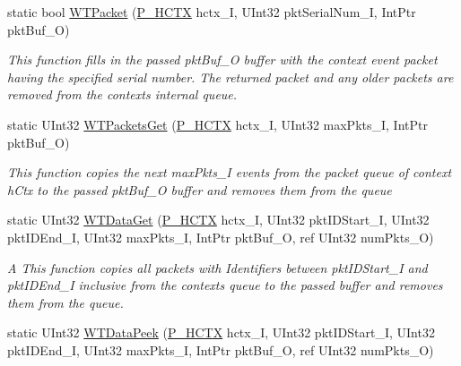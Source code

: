 \begin{DoxyCompactItemize}
static bool \mbox{\hyperlink{class_wintab_d_n_1_1_c_wintab_funcs_ae6705650a7f185b2fa67912761c1e5b3}{W\+T\+Packet}} (\mbox{\hyperlink{namespace_wintab_d_n_a9ae61204cd14d7ef23008991d1fb6dff}{P\+\_\+\+H\+C\+TX}} hctx\+\_\+I, U\+Int32 pkt\+Serial\+Num\+\_\+I, Int\+Ptr pkt\+Buf\+\_\+O)
\begin{DoxyCompactList}\small\item\em This function fills in the passed pkt\+Buf\+\_\+O buffer with the context event packet having the specified serial number. The returned packet and any older packets are removed from the context\textquotesingle{}s internal queue. \end{DoxyCompactList}\item 
static U\+Int32 \mbox{\hyperlink{class_wintab_d_n_1_1_c_wintab_funcs_a3a2d7576ad89c1b63dbe8280e4b054b6}{W\+T\+Packets\+Get}} (\mbox{\hyperlink{namespace_wintab_d_n_a9ae61204cd14d7ef23008991d1fb6dff}{P\+\_\+\+H\+C\+TX}} hctx\+\_\+I, U\+Int32 max\+Pkts\+\_\+I, Int\+Ptr pkt\+Buf\+\_\+O)
\begin{DoxyCompactList}\small\item\em This function copies the next max\+Pkts\+\_\+I events from the packet queue of context h\+Ctx to the passed pkt\+Buf\+\_\+O buffer and removes them from the queue \end{DoxyCompactList}\item 
static U\+Int32 \mbox{\hyperlink{class_wintab_d_n_1_1_c_wintab_funcs_a95fc57793075f5982e0e8112d196c778}{W\+T\+Data\+Get}} (\mbox{\hyperlink{namespace_wintab_d_n_a9ae61204cd14d7ef23008991d1fb6dff}{P\+\_\+\+H\+C\+TX}} hctx\+\_\+I, U\+Int32 pkt\+I\+D\+Start\+\_\+I, U\+Int32 pkt\+I\+D\+End\+\_\+I, U\+Int32 max\+Pkts\+\_\+I, Int\+Ptr pkt\+Buf\+\_\+O, ref U\+Int32 num\+Pkts\+\_\+O)
\begin{DoxyCompactList}\small\item\em A This function copies all packets with Identifiers between pkt\+I\+D\+Start\+\_\+I and pkt\+I\+D\+End\+\_\+I inclusive from the context\textquotesingle{}s queue to the passed buffer and removes them from the queue. \end{DoxyCompactList}\item 
static U\+Int32 \mbox{\hyperlink{class_wintab_d_n_1_1_c_wintab_funcs_abc2c1e9420ca43c25de27b53ed95bcbb}{W\+T\+Data\+Peek}} (\mbox{\hyperlink{namespace_wintab_d_n_a9ae61204cd14d7ef23008991d1fb6dff}{P\+\_\+\+H\+C\+TX}} hctx\+\_\+I, U\+Int32 pkt\+I\+D\+Start\+\_\+I, U\+Int32 pkt\+I\+D\+End\+\_\+I, U\+Int32 max\+Pkts\+\_\+I, Int\+Ptr pkt\+Buf\+\_\+O, ref U\+Int32 num\+Pkts\+\_\+O)

\end{DoxyCompactItemize}

